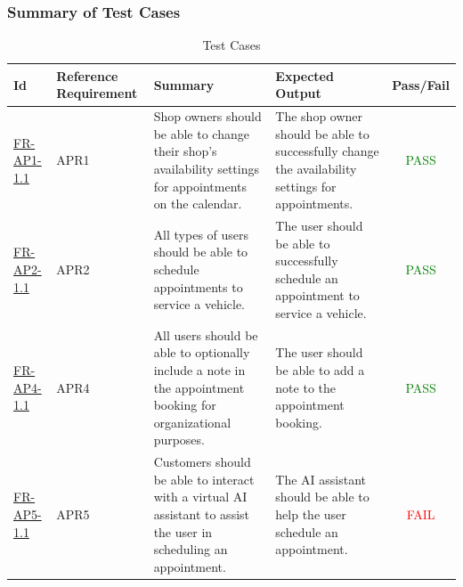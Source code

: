 \documentclass[12pt, titlepage]{article}
\newcommand{\testpass}{\textcolor{green}{PASS}}
\newcommand{\testfail}{\textcolor{red}{FAIL}}
\begin{document}
            \subsubsection{Summary of Test Cases}
            \begin{table}[H]
                \centering
                \begin{tabularx}{\textwidth}{|l|p{2cm}|X|X|c|}
                    \hline
                    Id & Reference Requirement & Summary & Expected Output & Pass/Fail \\ \hline
                    \hyperref[FR-AP1-1.1]{FR-AP1-1.1} & APR1 &  Shop owners should be able to change their shop's availability settings for appointments on the calendar. & The shop owner should be able to successfully change the availability settings for appointments. & \testpass \\ \hline
                    \hyperref[FR-AP2-1.1]{FR-AP2-1.1} & APR2 &  All types of users should be able to schedule appointments to service a vehicle. & The user should be able to successfully schedule an appointment to service a vehicle. & \testpass \\ \hline
                    \hyperref[FR-AP4-1.1]{FR-AP4-1.1} & APR4 & All users should be able to optionally include a note in the appointment booking for organizational purposes. & The user should be able to add a note to the appointment booking. & \testpass \\ \hline
                    \hyperref[FR-AP5-1.1]{FR-AP5-1.1} & APR5 & Customers should be able to interact with a virtual AI assistant to assist the user in scheduling an appointment. & The AI assistant should be able to help the user schedule an appointment. & \testfail \\ \hline
                \end{tabularx}
                \caption{Test Cases}
                \label{tab:Test_Cases}
            \end{table}
            
\end{document}
